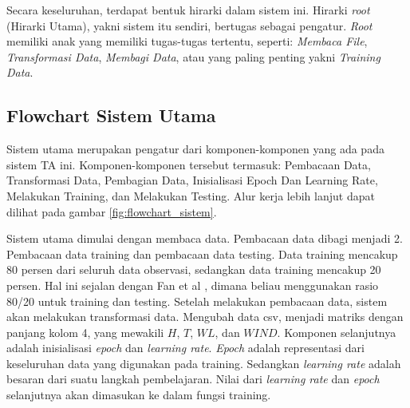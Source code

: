 Secara keseluruhan, terdapat bentuk hirarki dalam sistem ini. Hirarki \emph{root} (Hirarki Utama), yakni sistem itu sendiri, bertugas sebagai pengatur. \emph{Root} memiliki anak yang memiliki tugas-tugas tertentu, seperti: \emph{Membaca File}, \emph{Transformasi Data}, \emph{Membagi Data}, atau yang paling penting yakni \emph{Training Data}.

\subsection{Flowchart Sistem Utama}

  Sistem utama merupakan pengatur dari komponen-komponen yang ada pada sistem TA ini. Komponen-komponen tersebut termasuk: Pembacaan Data, Transformasi Data, Pembagian Data, Inisialisasi Epoch Dan Learning Rate, Melakukan Training, dan Melakukan Testing. Alur kerja lebih lanjut dapat dilihat pada gambar \ref{fig:flowchart_sistem}.

  Sistem utama dimulai dengan membaca data. Pembacaan data dibagi menjadi 2. Pembacaan data training dan pembacaan data testing. Data training mencakup 80 persen dari seluruh data observasi, sedangkan data training mencakup 20 persen. Hal ini sejalan dengan Fan et al \cite{fan2008liblinear}, dimana beliau menggunakan rasio 80/20 untuk training dan testing. Setelah melakukan pembacaan data, sistem akan melakukan transformasi data. Mengubah data csv, menjadi matriks dengan panjang kolom 4, yang mewakili $H$, $T$, $WL$, dan $WIND$. Komponen selanjutnya adalah inisialisasi \emph{epoch} dan \emph{learning rate}. \emph{Epoch} adalah representasi dari keseluruhan data yang digunakan pada training. Sedangkan \emph{learning rate} adalah besaran dari suatu langkah pembelajaran. Nilai dari \emph{learning rate} dan \emph{epoch} selanjutnya akan dimasukan ke dalam fungsi training.

